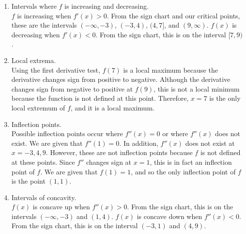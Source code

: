 \documentclass[nooutcomes]{ximera}
\begin{document}
\begin{problem}
\begin{freeResponse}
\begin{enumerate}
      \item
        Intervals where $f$ is increasing and decreasing.  \\
        $f$ is increasing when $f'(x)>0$.
        From the sign chart and our critical points, these are the intervals $(-\infty ,-3)$, $(-3,4)$, $(4,7]$, and $(9,\infty )$.
        $f(x)$ is decreasing when $f'(x)<0$.
        From the sign chart, this is on the interval $[7,9)$.
			
      \item
        Local extrema.  \\
        Using the first derivative test, $f(7)$ is a local maximum because the derivative changes sign from positive to negative.
        Although the derivative changes sign from negative to positive at $f(9)$, this is not a local minimum because the function is not defined at this point.
        Therefore, $x=7$ is the only local extremum of $f$, and it is a local maximum.
			
      \item
        Inflection points.  \\
        Possible inflection points occur where $f''(x)=0$ or where $f''(x)$ does not exist.
        We are given that $f''(1)=0$.
        In addition, $f''(x)$ does not exist at $x=-3,4,9$.
        However, these are not inflection points because $f$ is not defined at these points.
        Since $f''$ changes sign at $x=1$, this is in fact an inflection point of $f$.
        We are given that $f(1) = 1$, and so the only inflection point of $f$ is the point $(1,1)$.  
			
      \item
        Intervals of concavity.  \\
        $f(x)$ is concave up when $f''(x)>0$.
        From the sign chart, this is on the intervals $(-\infty ,-3)$ and $(1,4)$.
        $f(x)$ is concave down when $f''(x)<0$.
        From the sign chart, this is on the interval $(-3,1)$ and $(4,9)$.
        

\end{enumerate}
\end{freeResponse}
\end{problem}
\end{document}
